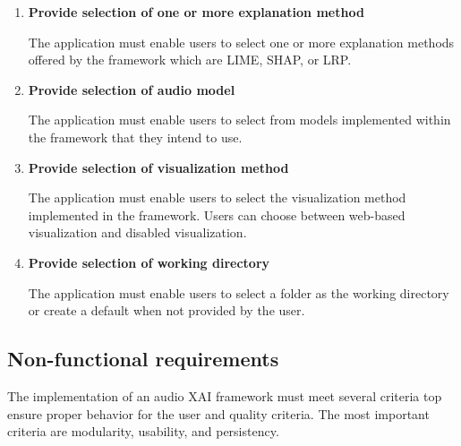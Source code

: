 \documentclass[
    bindingoffset=5mm,  %
    footnoteindent=3mm, %
    hyphenation=true    %
]{src/wut-thesis}
\begin{document}
    \begin{enumerate}[itemsep=1\baselineskip]

    \item \textbf{Provide selection of one or more explanation method}

        The application must enable users to select one or more explanation methods offered by the framework which are LIME, SHAP, or LRP.

    \item \textbf{Provide selection of audio model}

            The application must enable users to select from models implemented within the framework that they
        intend to use. 

    \item \textbf{Provide selection of visualization method}

        The application must enable users to select the visualization method implemented in the framework.
    Users can choose between web-based visualization and disabled visualization.

    \item \textbf{Provide selection of working directory}

    The application must enable users to select a folder as the working directory or create a default when not provided by the user.

    \end{enumerate}

\subsection{Non-functional requirements} \label{ch:NonFuncRequirements}

    The implementation of an audio XAI framework must meet several criteria
    top ensure proper behavior for the user and quality criteria.
    The most important criteria are modularity, usability, and persistency.
\end{document}
